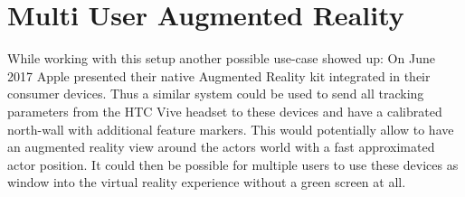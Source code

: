 \section{Multi User Augmented Reality}

While working with this setup another possible use-case showed up: On June 2017 
Apple presented their native Augmented Reality kit integrated in their consumer 
devices. Thus a similar system could be used to send all tracking parameters 
from the HTC Vive headset to these devices and have a calibrated north-wall 
with additional feature markers. This would potentially allow to have an 
augmented reality view around the actors world with a fast approximated actor 
position. It could then be possible for multiple users to use these devices as 
window into the virtual reality experience without a green screen at all.